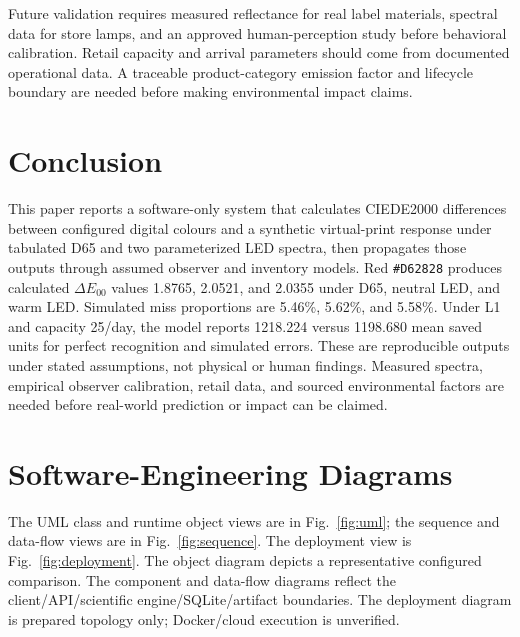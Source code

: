 \documentclass[journal]{IEEEtran}
\newcommand{\dE}{\ensuremath{\Delta E_{00}}}
\begin{document}
Future validation requires measured reflectance for real label materials, spectral data for store lamps, and an approved human-perception study before behavioral calibration. Retail capacity and arrival parameters should come from documented operational data. A traceable product-category emission factor and lifecycle boundary are needed before making environmental impact claims.


\section{Conclusion}
This paper reports a software-only system that calculates CIEDE2000 differences between configured digital colours and a synthetic virtual-print response under tabulated D65 and two parameterized LED spectra, then propagates those outputs through assumed observer and inventory models. Red \texttt{\#D62828} produces calculated \dE{} values 1.8765, 2.0521, and 2.0355 under D65, neutral LED, and warm LED. Simulated miss proportions are 5.46\%, 5.62\%, and 5.58\%. Under L1 and capacity 25/day, the model reports 1218.224 versus 1198.680 mean saved units for perfect recognition and simulated errors. These are reproducible outputs under stated assumptions, not physical or human findings. Measured spectra, empirical observer calibration, retail data, and sourced environmental factors are needed before real-world prediction or impact can be claimed.

\appendices
\section{Software-Engineering Diagrams}
The UML class and runtime object views are in Fig.~\ref{fig:uml}; the sequence and data-flow views are in Fig.~\ref{fig:sequence}. The deployment view is Fig.~\ref{fig:deployment}. The object diagram depicts a representative configured comparison. The component and data-flow diagrams reflect the client/API/scientific engine/SQLite/artifact boundaries. The deployment diagram is prepared topology only; Docker/cloud execution is unverified.
\end{document}
